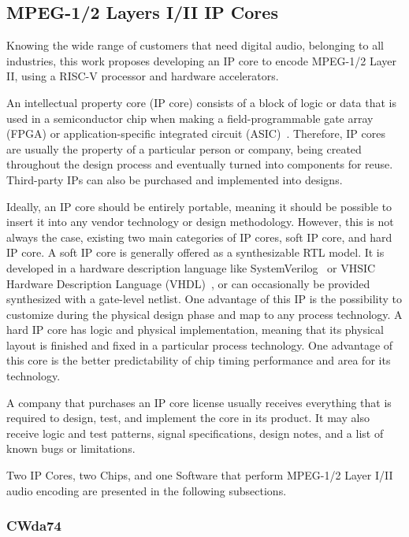 \subsection{MPEG-1/2 Layers I/II IP Cores}

Knowing the wide range of customers that need digital audio, belonging to all industries, this work proposes developing an IP core to encode MPEG-1/2 Layer II, using a RISC-V processor and hardware accelerators.
 
An intellectual property core (IP core) consists of a block of logic or data that is used in a semiconductor chip when making a field-programmable gate array (FPGA) or application-specific integrated circuit (ASIC)~\cite{fpga}.
Therefore, IP cores are usually the property of a particular person or company, being created throughout the design process and eventually turned into components for reuse. Third-party IPs can also be purchased and implemented into designs. 

Ideally, an IP core should be entirely portable, meaning it should be possible to insert it into any vendor technology or design methodology. However, this is not always the case, existing two main categories of IP cores, soft IP core, and hard IP core. 
A soft IP core is generally offered as a synthesizable RTL model. It is developed in a hardware description language like SystemVerilog~\cite{systemverilog} or VHSIC Hardware Description Language (VHDL)~\cite{vhdl}, or can occasionally be provided synthesized with a gate-level netlist. One advantage of this IP is the possibility to customize during the physical design phase and map to any process technology. 
A hard IP core has logic and physical implementation, meaning that its physical layout is finished and fixed in a particular process technology.
One advantage of this core is the better predictability of chip timing performance and area for its technology. 

A company that purchases an IP core license usually receives everything that is required to design, test, and implement the core in its product. It may also receive logic and test patterns, signal specifications, design notes, and a list of known bugs or limitations.

Two IP Cores, two Chips, and one Software that perform MPEG-1/2 Layer I/II audio encoding are presented in the following subsections.

\subsubsection{CWda74}
 
